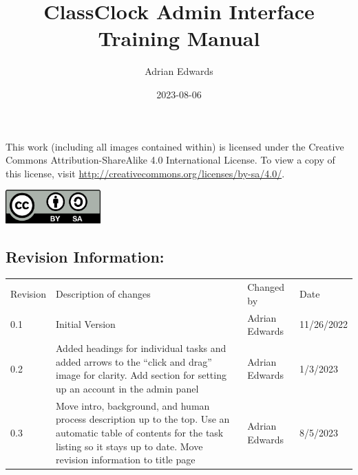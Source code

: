 \documentclass{article}
\title{ClassClock Admin Interface \\Training Manual}
\author{Adrian Edwards}
\date{2023-08-06}
\begin{document}
\makeatletter
\begin{titlepage}
    
	\begin{FlushRight}
		\vspace*{1cm}
			
		\Huge
		\textbf{\@title}
			
		\vspace{0.5cm}
		\LARGE
		\@date
			
		\vspace{1.5cm}
			
		\textbf{\@author}
	\end{FlushRight}
		
	\vfill
	\begin{center}
        
		{This work (including all images contained within) is licensed under the Creative Commons Attribution-ShareAlike 4.0
		International License. To view a copy of this license, visit \href{http://creativecommons.org/licenses/by-sa/4.0/}{http://creativecommons.org/licenses/by-sa/4.0/}.}



		\includegraphics[width=1.439in,height=0.5043in]{Mini20Manual-img001.png}
            
    \end{center}
\end{titlepage}
\makeatother

\clearpage
\large
\subsection*{Revision Information:}

\bigskip
\normalsize
{
	\centering
	\begin{tabularx}{\textwidth}{m{3.5em} X m{7.2em} m{1em}}
	{Revision} &
	{Description of changes} &
	{Changed by} &
	{Date}\\

	{0.1} &
	{Initial Version} &
	{Adrian Edwards} &
	{11/26/2022}\\

	{0.2} &
	{Added headings for individual tasks and added arrows to the “click and drag” image for
	clarity. Add section for setting up an account in the admin panel} &
	{Adrian Edwards} &
	{1/3/2023}\\

	{0.3} &
	{Move intro, background, and human process description up to the top. Use an automatic table of
	contents for the task listing so it stays up to date. Move revision information to title page} &
	{Adrian Edwards} &
	{8/5/2023}\\
\end{tabularx}\par
}
\end{document}
